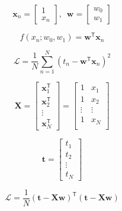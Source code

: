 \documentclass[english,10pt,aspectratio=169,fleqn]{beamer}
\begin{document}
\begin{frame} %

\begin{equation*}
\mathbf{x}_{n} = \begin{bmatrix}
1 \\
x_{n}
\end{bmatrix}
,\,\,\,%
\mathbf{w} = \begin{bmatrix}
w_{0} \\
w_{1}
\end{bmatrix}
\end{equation*}

\begin{equation}
f(x_n; w_0, w_1) = \mathbf{w}^{\mathsf{T}} \mathbf{x}_{n}
\label{eq:model_linear_02}
\end{equation}
  
\begin{equation}
\mathcal{L} = \frac{1}{N} \sum_{n=1}^{N} \left( t_{n} - \mathbf{w}^{\mathsf{T}}
\mathbf{x}_{n} \right)^2
\label{eq:loss_function_02}
\end{equation}

\begin{equation*}
\mathbf{X} = \begin{bmatrix}
\mathbf{x}^{\mathsf{T}}_{1} \\
\mathbf{x}^{\mathsf{T}}_{2} \\
\vdots \\
\mathbf{x}^{\mathsf{T}}_{N}
\end{bmatrix} =
\begin{bmatrix}
1 & x_{1} \\
1 & x_{2} \\
\vdots & \vdots \\
1 & x_{N} \\
\end{bmatrix}
\end{equation*}
  
\begin{equation}
\mathbf{t} = \begin{bmatrix}
t_1 \\
t_2 \\
\vdots \\
t_N
\end{bmatrix}
\end{equation}

\begin{equation}
\mathcal{L} = \frac{1}{N} \left( \mathbf{t} - \mathbf{Xw} \right)^{\mathsf{T}}
\left( \mathbf{t} - \mathbf{Xw} \right)
\end{equation}


\end{frame}
\end{document}
